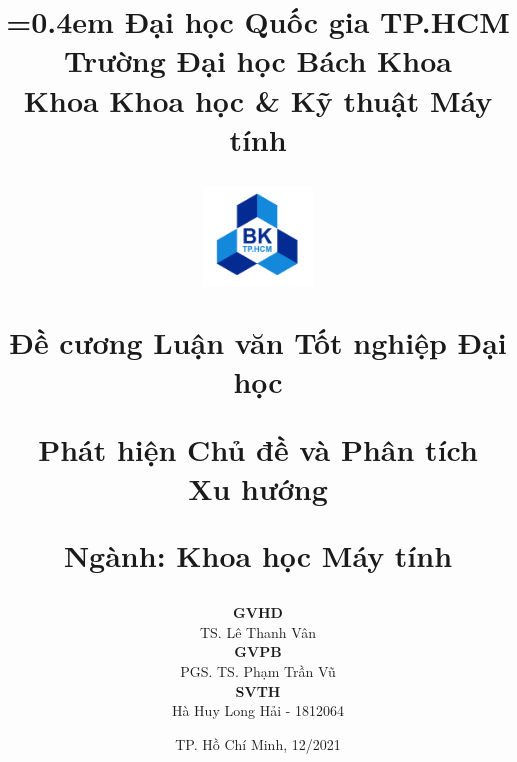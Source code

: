 \title{
	{\parskip=0.4em\Large
			Đại học Quốc gia TP.HCM\\[-0.2em]
			Trường Đại học Bách Khoa\\[-0.2em]
			Khoa Khoa học \& Kỹ thuật Máy tính\\
		}
	\vspace{0.5cm}
	\begin{figure}[!ht]
		\centering
		\includegraphics[width=0.26\textwidth]{img/logo/LogoBKChinhThuc.png}
	\end{figure}
	\vspace{0.1cm}
	{\Large Đề cương Luận văn Tốt nghiệp Đại học} \\
	\vspace{0.2cm}

	\Huge \textbf{\renewcommand{\baselinestretch}{0.1}
		Phát hiện Chủ đề và Phân tích\\[-0.2em]Xu hướng}

	\vspace{0.2cm}
	
	\large{Ngành: Khoa học Máy tính}
	\vspace{-1cm}
}
\author{
	\large
		\textbf{GVHD}\\[0.1em]
		TS. Lê Thanh Vân\\[1em]
		\textbf{GVPB}\\[0.1em]
		PGS. TS. Phạm Trần Vũ\\[1em]
		\textbf{SVTH}\\[0.1em]
		Hà Huy Long Hải - 1812064\\
}



\date{
	\normalsize{TP. Hồ Chí Minh, 12/2021}
}

\maketitle
\thispagestyle{empty}
